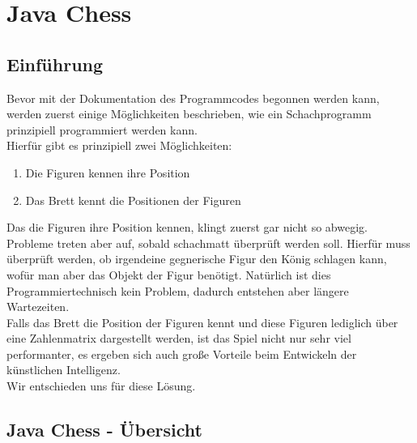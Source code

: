 \documentclass[12pt,a4paper]{article}
\begin{document}
{ 
\clearpage\vfill\newpage{}

\section{Java Chess}
\label{SEC:JAVACHESS}

\subsection{Einführung}
\label{SUBSEC:JAVACHESS-INTRO}

Bevor mit der Dokumentation des Programmcodes begonnen werden kann, werden zuerst einige Möglichkeiten beschrieben, wie ein Schachprogramm prinzipiell programmiert werden kann.\\
Hierfür gibt es prinzipiell zwei Möglichkeiten:

\begin{enumerate}
	\item{Die Figuren kennen ihre Position}
	\item{Das Brett kennt die Positionen der Figuren}
\end{enumerate}
Das die Figuren ihre Position kennen, klingt zuerst gar nicht so abwegig. Probleme treten aber auf, sobald schachmatt überprüft werden soll. Hierfür muss überprüft werden, ob irgendeine gegnerische Figur den König schlagen kann, wofür man aber das Objekt der Figur benötigt. Natürlich ist dies Programmiertechnisch kein Problem, dadurch entstehen aber längere Wartezeiten. \\
Falls das Brett die Position der Figuren kennt und diese Figuren lediglich über eine Zahlenmatrix dargestellt werden, ist das Spiel nicht nur sehr viel performanter, es ergeben sich auch große Vorteile beim Entwickeln der künstlichen Intelligenz. \\ 
Wir entschieden uns für diese Lösung.

\subsection{Java Chess - Übersicht}
\label{SUBSEC:JAVACHESS-OVERVIEW}

}
\end{document}
